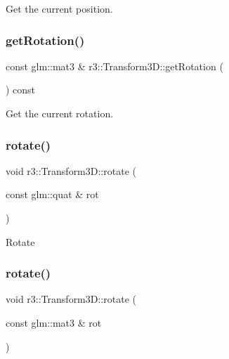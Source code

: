Get the current position. \mbox{\label{classr3_1_1_transform3_d_a1bad817e81d93f275ac71864fae763aa}} 
\subsubsection{\texorpdfstring{get\+Rotation()}{getRotation()}}
{\footnotesize\ttfamily const glm\+::mat3 \& r3\+::\+Transform3\+D\+::get\+Rotation (\begin{DoxyParamCaption}{ }\end{DoxyParamCaption}) const}

Get the current rotation. \mbox{\label{classr3_1_1_transform3_d_aaf633209948d35ca4b90422614a84478}} 
\subsubsection{\texorpdfstring{rotate()}{rotate()}\hspace{0.1cm}{\footnotesize\ttfamily [1/2]}}
{\footnotesize\ttfamily void r3\+::\+Transform3\+D\+::rotate (\begin{DoxyParamCaption}\item[{const glm\+::quat \&}]{rot }\end{DoxyParamCaption})}

Rotate \mbox{\label{classr3_1_1_transform3_d_a802314a0dee26e4a5fb96666cd39741c}} 
\subsubsection{\texorpdfstring{rotate()}{rotate()}\hspace{0.1cm}{\footnotesize\ttfamily [2/2]}}
{\footnotesize\ttfamily void r3\+::\+Transform3\+D\+::rotate (\begin{DoxyParamCaption}\item[{const glm\+::mat3 \&}]{rot }\end{DoxyParamCaption})}

